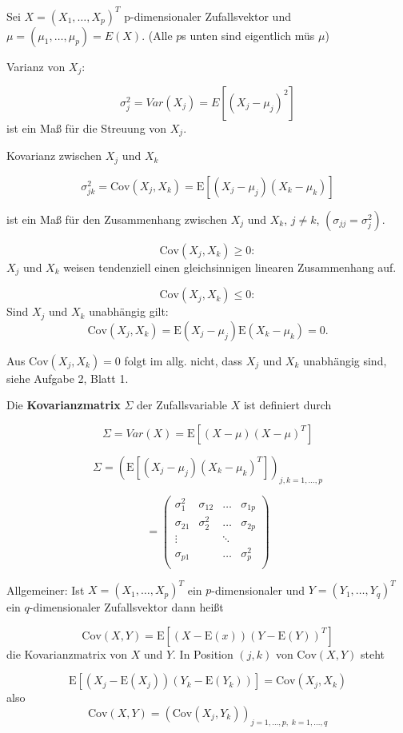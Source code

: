 \documentclass[12pt, a4paper]{article}
\newcommand{\E}{\mbox{I\negthinspace E}}
\theoremstyle{plain}
\theoremstyle{definition}
\newcommand{\1}{\mathds{1}}
\renewcommand{\E}{\mathrm{E}}
\newcommand{\Cov}{\mathrm{Cov}}
\begin{document}
Sei $ X = (X_1, \dots, X_p)^T $ p-dimensionaler Zufallsvektor und $ \mu = (\mu_1, \dots, \mu_p) = E(X) $. (Alle $p$s unten sind eigentlich müs $\mu$)

Varianz von $X_j$:

\[  \sigma_j^2 = Var(X_j) = E[(X_j - \mu_j)^2]     \] ist ein Maß für die Streuung von $X_j$.

Kovarianz zwischen $X_j$ und $X_k$ 

\[  \sigma_{jk}^2 = \Cov(X_j, X_k) = \E[(X_j - \mu_j)(X_k - \mu_k )]   \]

ist ein Maß für den Zusammenhang zwischen $X_j$ und $X_k$, $j \neq k$, $(\sigma_{jj} = \sigma_j^2)$.

\[ \Cov (X_j, X_k) \geq 0:   \] $X_j$ und $X_k$ weisen tendenziell einen gleichsinnigen linearen Zusammenhang auf.

\[ \Cov (X_j, X_k) \leq 0:  \] Sind $X_j$ und $X_k$ unabhängig gilt:
\[  \Cov (X_j, X_k) = \E(X_j - \mu_j) \E(X_k - \mu_k)   = 0. \]

Aus $\Cov(X_j, X_k) = 0$ folgt im allg. nicht, dass $X_j$ und $X_k$ unabhängig sind, siehe Aufgabe 2, Blatt 1.

Die \textbf{Kovarianzmatrix} $\Sigma$ der Zufallsvariable $X$ ist definiert durch 

\[ \Sigma = Var(X) =  \E[(X-\mu)(X - \mu)^T] \]

\[ \Sigma =   (\E[(X_j - \mu_j)(X_k - \mu_k)^T])_{j,k = 1,\ldots,p} \]

\[= \begin{pmatrix}

\sigma_1^2 & \sigma_{12} & \ldots & \sigma_{1p} \\
\sigma_{21} & \sigma_2^2 & \ldots & \sigma_{2p} \\
\vdots & & \ddots  & \\
\sigma_{p1} && \ldots & \sigma_{p}^2 \\

\end{pmatrix}  \]


Allgemeiner: Ist $X = (X_1, \ldots, X_p)^T$ ein $p$-dimensionaler und $Y = (Y_1, \ldots, Y_q)^T$ ein $q$-dimensionaler Zufallsvektor dann heißt

\[ \Cov(X,Y) = \E[(X-\E(x))(Y-\E(Y))^T  ]  \] die Kovarianzmatrix von $X$ und $Y$. In Position $(j,k)$ von $ \Cov(X,Y) $ steht

\[ \E [(X_j - \E(X_j))(Y_k - \E(Y_k)) ] = \Cov(X_j, X_k) \] also \[ \Cov(X,Y) = (\Cov(X_j, Y_k))_{j = 1, \ldots, p, \; k = 1, \ldots, q} \]
\end{document}
